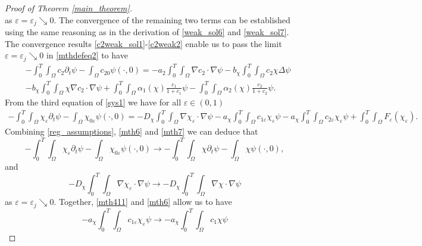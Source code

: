\documentclass[a4paper,10pt]{article}
\theoremstyle{definition}
\begin{document}
\begin{proof}[Proof of Theorem \ref{main_theorem}]
\begin{equation}
\end{equation}
as $\varepsilon = \varepsilon_j \searrow 0$. The convergence of the remaining two terms can be established using the same reasoning as in the derivation of \eqref{weak_sol6} and \eqref{weak_sol7}.
The convergence results \eqref{c2weak_sol1}-\eqref{c2weak2} enable us to pass the limit $\varepsilon = \varepsilon_j \searrow 0$ in \eqref{mthdefeq2} to have
\begin{align}
   \label{weakmthdefeq2}
  \nonumber  & - \int_0^T \int_\Omega c_{2} \partial_t \psi - \int_\Omega c_{20} \psi(\cdot, 0) = - a_2 \int_0^T \int_\Omega \nabla c_{2} \cdot \nabla \psi  - b_\chi \int_0^T \int_\Omega c_{2} \chi \Delta \psi \\[5pt]
  & - b_\chi \int_0^T \int_\Omega \chi \nabla c_{2 } \cdot \nabla \psi + \int_0^T \int_\Omega \alpha_1(\chi)\tfrac{c_{1}}{1 + c_{1}} \psi - \int_0^T \int_\Omega \alpha_2(\chi)\tfrac{c_{2}}{1 + c_{2}} \psi.
\end{align}
From the third equation of \eqref{sys1} we have for all $\varepsilon \in (0, 1)$
\begin{align}
   \label{mthdefeq3}
  - \int_0^T \int_\Omega \chi_{\varepsilon} \partial_t \psi - \int_\Omega \chi_{0\varepsilon} \psi(\cdot, 0) = - D_\chi \int_0^T \int_\Omega \nabla \chi_{\varepsilon} \cdot \nabla \psi - a_\chi \int_0^T \int_\Omega c_{1\varepsilon}\chi_\varepsilon \psi - a_\chi \int_0^T \int_\Omega c_{2\varepsilon}\chi_\varepsilon \psi + \int_0^T \int_\Omega F_\varepsilon(\chi_\varepsilon).
\end{align}
Combining \eqref{reg_assumptions}, \eqref{mth6} and \eqref{mth7} we can deduce that
\begin{equation}
  \label{chiweak_sol1}
  - \int_0^T \int_\Omega \chi_{\varepsilon} \partial_t \psi - \int_\Omega \chi_{0\varepsilon} \psi(\cdot, 0) \to - \int_0^T \int_\Omega \chi \partial_t \psi - \int_\Omega \chi \psi(\cdot, 0),
\end{equation}
and
\begin{equation}
\label{chiweak_sol2}
 - D_\chi \int_0^T \int_\Omega \nabla \chi_{\varepsilon} \cdot \nabla \psi \to  - D_\chi \int_0^T \int_\Omega \nabla \chi \cdot \nabla \psi
\end{equation}
as $\varepsilon = \varepsilon_j \searrow 0$. Together, \eqref{mth411} and \eqref{mth6} allow us to have
\begin{equation}
  \label{chi_weak1}
  - a_\chi \int_0^T \int_\Omega c_{1\varepsilon}\chi_\varepsilon \psi  \to - a_\chi \int_0^T \int_\Omega c_{1}\chi \psi
\end{equation}

\end{proof}
\end{document}
